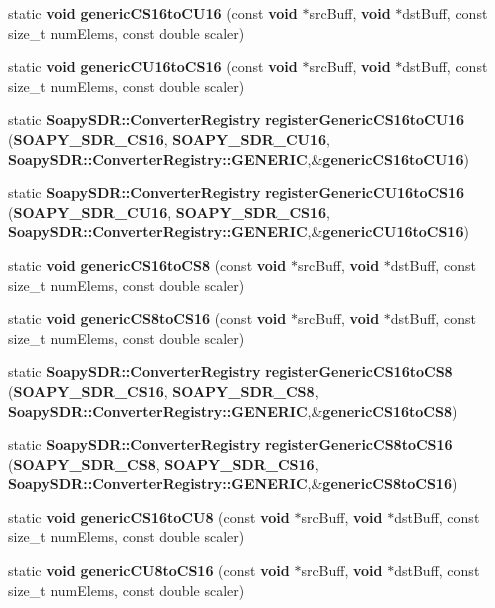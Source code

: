 \begin{DoxyCompactItemize}
static {\bf void} {\bf generic\+C\+S16to\+C\+U16} (const {\bf void} $\ast$src\+Buff, {\bf void} $\ast$dst\+Buff, const size\+\_\+t num\+Elems, const double scaler)
\item 
static {\bf void} {\bf generic\+C\+U16to\+C\+S16} (const {\bf void} $\ast$src\+Buff, {\bf void} $\ast$dst\+Buff, const size\+\_\+t num\+Elems, const double scaler)
\item 
static {\bf Soapy\+S\+D\+R\+::\+Converter\+Registry} {\bf register\+Generic\+C\+S16to\+C\+U16} ({\bf S\+O\+A\+P\+Y\+\_\+\+S\+D\+R\+\_\+\+C\+S16}, {\bf S\+O\+A\+P\+Y\+\_\+\+S\+D\+R\+\_\+\+C\+U16}, {\bf Soapy\+S\+D\+R\+::\+Converter\+Registry\+::\+G\+E\+N\+E\+R\+IC},\&{\bf generic\+C\+S16to\+C\+U16})
\item 
static {\bf Soapy\+S\+D\+R\+::\+Converter\+Registry} {\bf register\+Generic\+C\+U16to\+C\+S16} ({\bf S\+O\+A\+P\+Y\+\_\+\+S\+D\+R\+\_\+\+C\+U16}, {\bf S\+O\+A\+P\+Y\+\_\+\+S\+D\+R\+\_\+\+C\+S16}, {\bf Soapy\+S\+D\+R\+::\+Converter\+Registry\+::\+G\+E\+N\+E\+R\+IC},\&{\bf generic\+C\+U16to\+C\+S16})
\item 
static {\bf void} {\bf generic\+C\+S16to\+C\+S8} (const {\bf void} $\ast$src\+Buff, {\bf void} $\ast$dst\+Buff, const size\+\_\+t num\+Elems, const double scaler)
\item 
static {\bf void} {\bf generic\+C\+S8to\+C\+S16} (const {\bf void} $\ast$src\+Buff, {\bf void} $\ast$dst\+Buff, const size\+\_\+t num\+Elems, const double scaler)
\item 
static {\bf Soapy\+S\+D\+R\+::\+Converter\+Registry} {\bf register\+Generic\+C\+S16to\+C\+S8} ({\bf S\+O\+A\+P\+Y\+\_\+\+S\+D\+R\+\_\+\+C\+S16}, {\bf S\+O\+A\+P\+Y\+\_\+\+S\+D\+R\+\_\+\+C\+S8}, {\bf Soapy\+S\+D\+R\+::\+Converter\+Registry\+::\+G\+E\+N\+E\+R\+IC},\&{\bf generic\+C\+S16to\+C\+S8})
\item 
static {\bf Soapy\+S\+D\+R\+::\+Converter\+Registry} {\bf register\+Generic\+C\+S8to\+C\+S16} ({\bf S\+O\+A\+P\+Y\+\_\+\+S\+D\+R\+\_\+\+C\+S8}, {\bf S\+O\+A\+P\+Y\+\_\+\+S\+D\+R\+\_\+\+C\+S16}, {\bf Soapy\+S\+D\+R\+::\+Converter\+Registry\+::\+G\+E\+N\+E\+R\+IC},\&{\bf generic\+C\+S8to\+C\+S16})
\item 
static {\bf void} {\bf generic\+C\+S16to\+C\+U8} (const {\bf void} $\ast$src\+Buff, {\bf void} $\ast$dst\+Buff, const size\+\_\+t num\+Elems, const double scaler)
\item 
static {\bf void} {\bf generic\+C\+U8to\+C\+S16} (const {\bf void} $\ast$src\+Buff, {\bf void} $\ast$dst\+Buff, const size\+\_\+t num\+Elems, const double scaler)
\item 

\end{DoxyCompactItemize}
